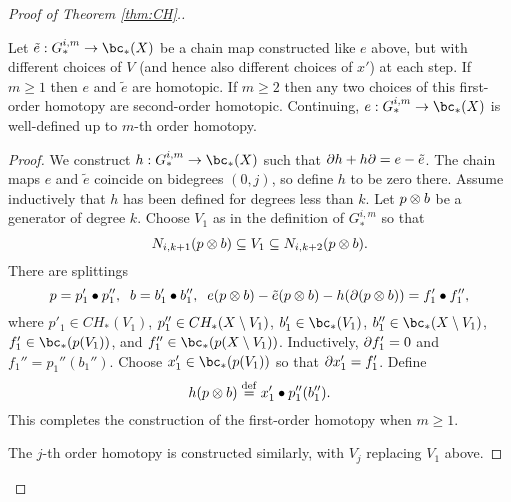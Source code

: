 {\begin{proof}[Proof of Theorem \ref{thm:CH}.]


\begin{lemma} \label{m_order_hty}
Let $\tilde{e} :  G_*^{i,m} \to \bc_*(X)$ be a chain map constructed like $e$ above, but with
different choices of $V$ (and hence also different choices of $x'$) at each step.
If $m \ge 1$ then $e$ and $\tilde{e}$ are homotopic.
If $m \ge 2$ then any two choices of this first-order homotopy are second-order homotopic.
Continuing, $e :  G_*^{i,m} \to \bc_*(X)$ is well-defined up to $m$-th order homotopy.
\end{lemma}

\begin{proof}
We construct $h: G_*^{i,m} \to \bc_*(X)$ such that $\partial h + h\partial = e - \tilde{e}$.
The chain maps $e$ and $\tilde{e}$ coincide on bidegrees $(0, j)$, so define $h$
to be zero there.
Assume inductively that $h$ has been defined for degrees less than $k$.
Let $p\otimes b$ be a generator of degree $k$.
Choose $V_1$ as in the definition of $G_*^{i,m}$ so that
\[
	N_{i,k+1}(p\otimes b) \subseteq V_1 \subseteq N_{i,k+2}(p\otimes b) .
\]
There are splittings
\[
	p = p'_1\bullet p''_1 , \;\; b = b'_1\bullet b''_1 , 
			\;\; e(p\otimes b) - \tilde{e}(p\otimes b) - h(\partial(p\otimes b)) = f'_1\bullet f''_1 ,
\]
where $p'_1 \in CH_*(V_1)$, $p''_1 \in CH_*(X\setminus V_1)$, 
$b'_1 \in \bc_*(V_1)$, $b''_1 \in \bc_*(X\setmin V_1)$, 
$f'_1 \in \bc_*(p(V_1))$, and $f''_1 \in \bc_*(p(X\setmin V_1))$.
Inductively, $\partial f'_1 = 0$ and $f_1'' = p_1''(b_1'')$.
Choose $x'_1 \in \bc_*(p(V_1))$ so that $\partial x'_1 = f'_1$.
Define 
\[
	h(p\otimes b) \stackrel{\mathrm{def}}{=} x'_1 \bullet p''_1(b''_1) .
\]
This completes the construction of the first-order homotopy when $m \ge 1$.

The $j$-th order homotopy is constructed similarly, with $V_j$ replacing $V_1$ above.
\end{proof}


\end{proof}}
